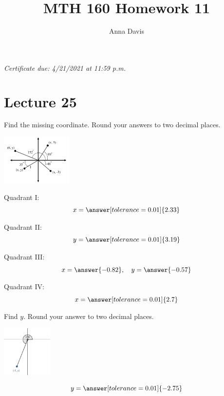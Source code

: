 \documentclass{ximera}
\author{Anna Davis} \title{MTH 160 Homework 11}
\begin{document}
\begin{abstract}

\end{abstract}
\maketitle
 \textit{Certificate due: 4/21/2021 at 11:59 p.m.}
 \section{Lecture 25}

\begin{problem}\label{prob:160hom10prob7}
Find the missing coordinate.  Round your answers to two decimal places.
\begin{image}
   
\includegraphics[height=1in]{160H10pic2.jpg}~
 
\end{image}

Quadrant I:
$$x=\answer[tolerance=0.01]{2.33}$$

Quadrant II:
$$y=\answer[tolerance=0.01]{3.19}$$

Quadrant III:
$$x=\answer{-0.82},\quad y=\answer{-0.57}$$

Quadrant IV:
$$x=\answer[tolerance=0.01]{2.7}$$
\end{problem}

\begin{problem}\label{prob:160hom10prob8}
Find $y$.  Round your answer to two decimal places.
 
 \begin{image}
   
\includegraphics[height=1in]{160H10pic1.jpg}

\end{image}
$$y=\answer[tolerance=0.01]{-2.75}$$
\end{problem}

 
 
\end{document}
